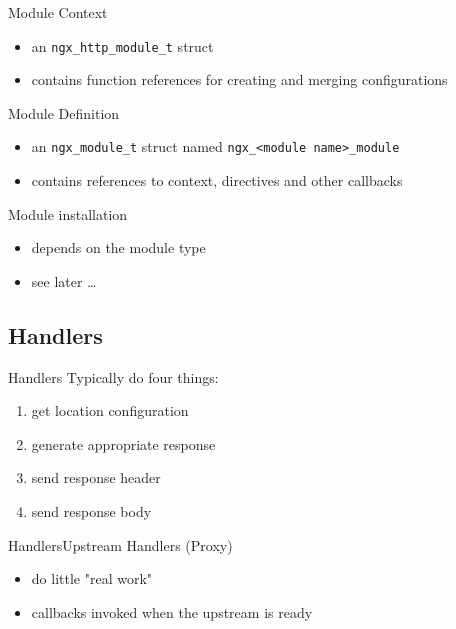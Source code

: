 \documentclass{beamer}
\begin{document}
\begin{frame}[fragile]{Module Context}
 \begin{itemize}
  \item an \verb|ngx_http_module_t| struct
  \item contains function references for creating and merging configurations
 \end{itemize}
\end{frame}

\begin{frame}[fragile]{Module Definition}
 \begin{itemize}
  \item an \verb|ngx_module_t| struct named \verb|ngx_<module name>_module|
  \item contains references to context, directives and other callbacks
 \end{itemize}
\end{frame}

\begin{frame}{Module installation}
\begin{itemize}
 \item depends on the module type 
 \item see later \ldots
\end{itemize}
\end{frame}

\subsection{Handlers}

\begin{frame}{Handlers}
Typically do four things:
\begin{enumerate}
 \item get location configuration
 \item generate appropriate response
 \item send response header
 \item send response body
\end{enumerate}
\end{frame}

\begin{frame}{Handlers}{Upstream Handlers (Proxy)}
\begin{itemize}
 \item do little "real work"
 \item callbacks invoked when the upstream is ready
\end{itemize}
\end{frame}
\end{document}
